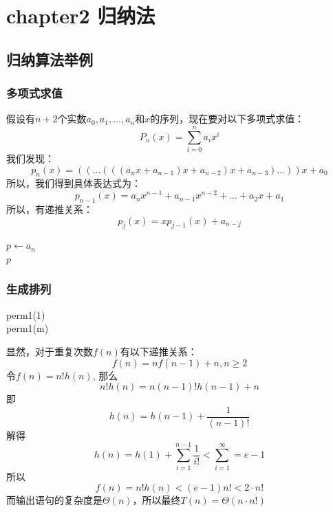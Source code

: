 \documentclass[./../main.tex]{subfiles}
\begin{document}
\section{chapter2 归纳法}

\subsection{归纳算法举例}
\subsubsection{多项式求值}
假设有$n+2$个实数$a_0,a_1,...,a_n$和$x$的序列，现在要对以下多项式求值：
\[
    P_n(x)=\sum_{i=0}^{n}a_ix^i
\]
我们发现：
\[
    p_n(x)=((...(((a_nx+a_{n-1})x+a_{n-2})x+a_{n-3})...))x+a_0
\]
所以，我们得到具体表达式为：
\[
    p_{n-1}(x)=a_nx^{n-1}+a_{n-1}x^{n-2}+...+a_2x+a_1
\]
所以，有递推关系：
\[
    p_j(x)=xp_{j-1}(x)+a_{n-j}
\]

\begin{algorithm}
    \SetAlgoLined
    \BlankLine
    $p\leftarrow a_n$\\
    \Return $p$
    \caption{HORNER}
\end{algorithm}

\subsubsection{生成排列}
\begin{algorithm}[h]
    \BlankLine
    perm1(1)\\
    perm1(m)\\
    \caption{PERMUTATIONS1}
\end{algorithm}

显然，对于重复次数$f(n)$有以下递推关系：
\[
    f(n)=nf(n-1)+n, n\ge2
\]
令$f(n)=n!h(n)$, 那么
\[
    n!h(n)=n(n-1)!h(n-1)+n
\]
即
\[
    h(n)=h(n-1)+\frac{1}{(n-1)!}
\]
解得
\[
    h(n)=h(1)+\sum_{i=1}^{n-1}\frac{1}{i!}<\sum_{i=1}^{\infty}=e-1
\]
所以
\[
    f(n)=n!h(n)<(e-1)n!<2\cdot n!
\]
而输出语句的复杂度是$\Theta(n)$，所以最终$T(n)=\Theta(n\cdot n!)$
\end{document}
